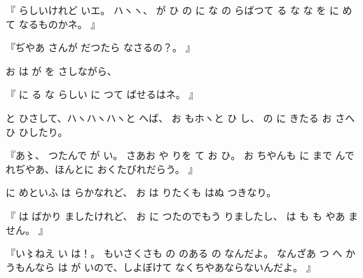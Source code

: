 『
らしいけれど
いエ。
ハヽヽ、
が
ひ
の
に
な
の
らばつて
る
な
な
を
に
めて
なるものかネ。
』

『ぢやあ
さんが
だつたら
なさるの？。
』

お
は
が
を
さしながら、

『
に
る
な
らしい
に
つて
ばせるはネ。
』

と
ひさして、ハヽハヽハヽと
へば、
お
もホヽと
ひ
し、
の
に
きたる
お
さへ
ひ
ひしたり。

『あ〻、%
つたんで
が
い。
さあお
や
りを
て
お
ひ。
お
ちやんも
に
まで
んで
れぢやあ、ほんとに
おくたびれだらう。
』

に
めといふ
は
らかなれど、
お
は
りたくも
はぬ
つきなり。

『
は
ばかり
ましたけれど、
お
に
つたのでもう
りましたし、
は
も
も
やあ
ません。
』

『い〻ねえ%
い
は！。
もいさくさも
の
のある
の
なんだよ。
なんざあ
つ
へ
かうもんなら
は
が
いので、しよぼけて
なくちやあならないんだよ。
』

